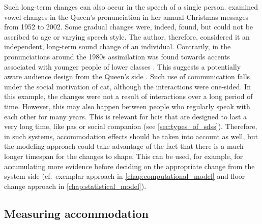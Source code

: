 Such long-term changes can also occur in the speech of a single person.
\citet{Harrington2007evidence} examined vowel changes in the Queen's pronunciation in her annual Christmas messages from 1952 to 2002.
Some gradual changes were, indeed, found, but could not be ascribed to age or varying speech style.
The author, therefore, considered it an independent, long-term sound change of an individual.
Contrarily, in the pronunciations around the 1980s assimilation was found towards accents associated with younger people of lower classes \citep{Harrington2000does, Harrington2000monophthongal}.
This suggests a potentially aware audience design from the Queen's side \citep{Bell1984language}.
Such use of communication falls under the social motivation of \ac{cat}, although the interactions were one-sided.
In this example, the changes were not a result of interactions over a long period of time.
However, this may also happen between people who regularly speak with each other for many years.
This is relevant for \acp{hci} that are designed to last a very long time, like \acp{pa} or social companion (see \cref{sec:types_of_sdss}).
Therefore, in such systems, accommodation effects should be taken into account as well, but the modeling approach could take advantage of the fact that there is a much longer timespan for the changes to shape.
This can be used, for example, for accumulating more evidence before deciding on the appropriate change from the system side (cf.\ exemplar approach in \cref{chap:computational_model} and floor-change approach in \cref{chap:statistical_model}).

\subsection{Measuring accommodation} %
\label{subsec:limitations_of_did}

